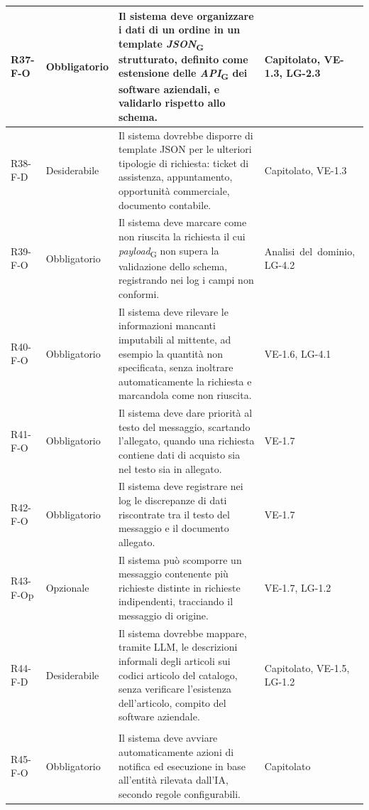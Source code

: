 {\begin{longtable}{|>{\raggedright\arraybackslash}p{1.8cm}|>{\raggedright\arraybackslash}p{2.3cm}|>{\raggedright\arraybackslash}p{6.6cm}|>{\raggedright\arraybackslash}p{3.1cm}|}
    \mbox{R37-F-O} & Obbligatorio & Il sistema deve organizzare i dati di un ordine in un template \textit{JSON}\textsubscript{G} strutturato, definito come estensione delle \textit{API}\textsubscript{G} dei software aziendali, e validarlo rispetto allo schema. & \mbox{Capitolato}, \mbox{VE-1.3}, \mbox{LG-2.3} \\ \hline
    \mbox{R38-F-D} & Desiderabile & Il sistema dovrebbe disporre di template JSON per le ulteriori tipologie di richiesta: ticket di assistenza, appuntamento, opportunità commerciale, documento contabile. & \mbox{Capitolato}, \mbox{VE-1.3} \\ \hline
    \mbox{R39-F-O} & Obbligatorio & Il sistema deve marcare come non riuscita la richiesta il cui \textit{payload}\textsubscript{G} non supera la validazione dello schema, registrando nei log i campi non conformi. & \mbox{Analisi del dominio}, \mbox{LG-4.2} \\ \hline
    \mbox{R40-F-O} & Obbligatorio & Il sistema deve rilevare le informazioni mancanti imputabili al mittente, ad esempio la quantità non specificata, senza inoltrare automaticamente la richiesta e marcandola come non riuscita. & \mbox{VE-1.6}, \mbox{LG-4.1} \\ \hline
    \mbox{R41-F-O} & Obbligatorio & Il sistema deve dare priorità al testo del messaggio, scartando l'allegato, quando una richiesta contiene dati di acquisto sia nel testo sia in allegato. & \mbox{VE-1.7} \\ \hline
    \mbox{R42-F-O} & Obbligatorio & Il sistema deve registrare nei log le discrepanze di dati riscontrate tra il testo del messaggio e il documento allegato. & \mbox{VE-1.7} \\ \hline
    \mbox{R43-F-Op} & Opzionale & Il sistema può scomporre un messaggio contenente più richieste distinte in richieste indipendenti, tracciando il messaggio di origine. & \mbox{VE-1.7}, \mbox{LG-1.2} \\ \hline
    \mbox{R44-F-D} & Desiderabile & Il sistema dovrebbe mappare, tramite LLM, le descrizioni informali degli articoli sui codici articolo del catalogo, senza verificare l'esistenza dell'articolo, compito del software aziendale. & \mbox{Capitolato}, \mbox{VE-1.5}, \mbox{LG-1.2} \\ \hline
    \multicolumn{4}{|l|}{\cellcolor[gray]{0.94}\textbf{Macroarea 5 --- Azioni, integrazione e gestione delle anomalie}} \\ \hline
    \mbox{R45-F-O} & Obbligatorio & Il sistema deve avviare automaticamente azioni di notifica ed esecuzione in base all'entità rilevata dall'IA, secondo regole configurabili. & \mbox{Capitolato} \\ \hline

\end{longtable}}
